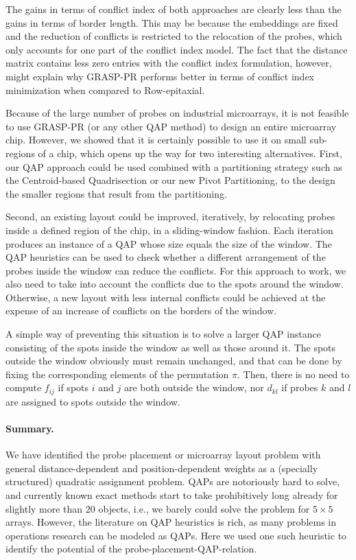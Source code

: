 \documentclass[english]{lni}
\begin{document}
The gains in terms of conflict index of both approaches are clearly less than the
gains in terms of border length. This may be because the embeddings are fixed and the
reduction of conflicts is restricted to the relocation of the probes, which only
accounts for one part of the conflict index model. The fact that the distance matrix
contains less zero entries with the conflict index formulation, however, might explain
why GRASP-PR performs better in terms of conflict index minimization when compared to
Row-epitaxial.

Because of the large number of probes on industrial microarrays, it is not
feasible to use GRASP-PR (or any other QAP method) to design an
entire microarray chip. However, we showed that it is certainly possible to use
it on small sub-regions of a chip, which opens up the way for two interesting
alternatives. First, our QAP approach could be used combined with a partitioning
strategy such as the Centroid-based Quadrisection or our new Pivot Partitioning,
to the design the smaller regions that result from the partitioning.

Second, an existing layout could be improved, iteratively, by relocating probes
inside a defined region of the chip, in a sliding-window fashion.
Each iteration produces an instance of a QAP whose size equals
the size of the window. The QAP heuristics can be used to check whether
a different arrangement of the probes inside the window can reduce the conflicts.
For this approach to work, we also need to take
into account the conflicts due to the spots around the window. Otherwise, a
new layout with less internal conflicts could be achieved at the expense of an
increase of conflicts on the borders of the window.

A simple way of preventing this situation is to solve a larger QAP instance
consisting of the spots inside the window as well as those around it. The
spots outside the window obviously must remain unchanged, and that can be done
by fixing the corresponding elements of the permutation $\pi$. Then,
there is no need to compute $f_{ij}$ if spots $i$ and $j$ are both outside the
window, nor $d_{kl}$ if probes $k$ and $l$ are assigned to spots outside the
window.

\paragraph{Summary.}
We have identified the probe placement or microarray layout problem with
general distance-dependent and position-dependent weights as a (specially
structured) quadratic assignment problem. QAPs are notoriously hard to solve,
and currently known exact methods start to take prohibitively long already for
slightly more than $20$ objects, i.e., we barely could solve the problem for
$5\times 5$ arrays. However, the literature on QAP heuristics is rich,
as many problems in operations research can be modeled as QAPs. Here we used
one such heuristic to identify the potential of the
probe-placement-QAP-relation.
\end{document}
